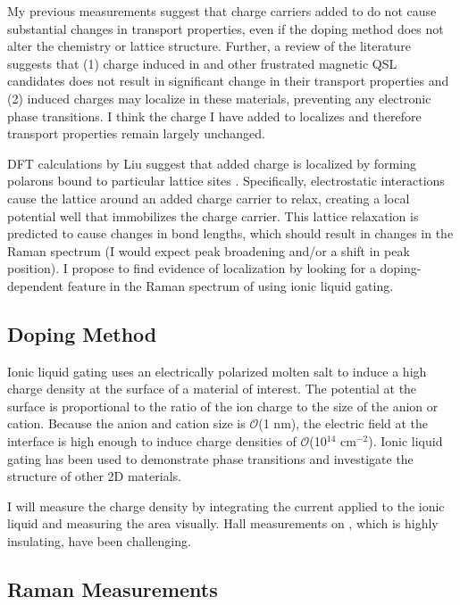 \documentclass[11pt]{article}
\begin{document}
My previous measurements suggest that charge carriers added to \rucl do not cause substantial changes in transport properties, even if the doping method does not alter the chemistry or lattice structure. Further, a review of the literature suggests that (1) charge induced in \rucl and other frustrated magnetic QSL candidates does not result in significant change in their transport properties and (2) induced charges may localize in these materials, preventing any electronic phase transitions. I think the charge I have added to \rucl localizes and therefore transport properties remain largely unchanged.

DFT calculations by Liu suggest that added charge is localized by forming polarons bound to particular lattice sites \cite{Liu2018}. Specifically, electrostatic interactions cause the lattice around an added charge carrier to relax, creating a local potential well that immobilizes the charge carrier. This lattice relaxation is predicted to cause changes in bond lengths, which should result in changes in the Raman spectrum (I would expect peak broadening and/or a shift in peak position). I propose to find evidence of localization by looking for a doping-dependent feature in the Raman spectrum of \rucl using ionic liquid gating.

\subsection{Doping Method}

Ionic liquid gating uses an electrically polarized molten salt to induce a high charge density at the surface of a material of interest. The potential at the surface is proportional to the ratio of the ion charge to the size of the anion or cation. Because the anion and cation size is $\mathcal{O}$(1 nm), the electric field at the interface is high enough to induce charge densities of $\mathcal{O}$(10$^{14}$ cm$^{-2}$). Ionic liquid gating has been used to demonstrate phase transitions and investigate the structure of other 2D materials\cite{Braga2012,Ueno2008}.

I will measure the charge density by integrating the current applied to the ionic liquid and measuring the area visually. Hall measurements on \ruclnospace, which is highly insulating, have been challenging.

\subsection{Raman Measurements}
\end{document}
